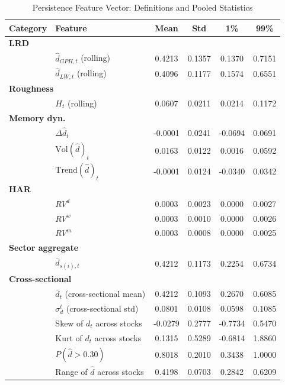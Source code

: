 
\begin{table}[htbp]
\centering
\caption{Persistence Feature Vector: Definitions and Pooled Statistics}
\label{tab:features}
\small
\begin{tabular}{llcccc}
\toprule
Category & Feature & Mean & Std & 1\% & 99\% \\
\midrule
\multicolumn{6}{l}{\textbf{LRD}} \\
  & $\hat d_{GPH,t}$ (rolling) & 0.4213 & 0.1357 & 0.1370 & 0.7151 \\
  & $\hat d_{LW,t}$ (rolling) & 0.4096 & 0.1177 & 0.1574 & 0.6551 \\
\midrule
\multicolumn{6}{l}{\textbf{Roughness}} \\
  & $H_t$ (rolling) & 0.0607 & 0.0211 & 0.0214 & 0.1172 \\
\midrule
\multicolumn{6}{l}{\textbf{Memory dyn.}} \\
  & $\Delta\hat d_t$ & -0.0001 & 0.0241 & -0.0694 & 0.0691 \\
  & $\mathrm{Vol}(\hat d)_t$ & 0.0163 & 0.0122 & 0.0016 & 0.0592 \\
  & $\mathrm{Trend}(\hat d)_t$ & -0.0001 & 0.0124 & -0.0340 & 0.0342 \\
\midrule
\multicolumn{6}{l}{\textbf{HAR}} \\
  & $RV^d$ & 0.0003 & 0.0023 & 0.0000 & 0.0027 \\
  & $RV^w$ & 0.0003 & 0.0010 & 0.0000 & 0.0026 \\
  & $RV^m$ & 0.0003 & 0.0008 & 0.0000 & 0.0025 \\
\midrule
\multicolumn{6}{l}{\textbf{Sector aggregate}} \\
  & $\bar d_{s(i),t}$ & 0.4212 & 0.1173 & 0.2254 & 0.6734 \\
\midrule
\multicolumn{6}{l}{\textbf{Cross-sectional}} \\
  & $\bar d_t$ (cross-sectional mean) & 0.4212 & 0.1093 & 0.2670 & 0.6085 \\
  & $\sigma_d^t$ (cross-sectional std) & 0.0801 & 0.0108 & 0.0598 & 0.1085 \\
  & Skew of $d_t$ across stocks & -0.0279 & 0.2777 & -0.7734 & 0.5470 \\
  & Kurt of $d_t$ across stocks & 0.1315 & 0.5289 & -0.6814 & 1.8860 \\
  & $P(\hat d > 0.30)$ & 0.8018 & 0.2010 & 0.3438 & 1.0000 \\
  & Range of $\hat d$ across stocks & 0.4198 & 0.0703 & 0.2842 & 0.6209 \\

\end{tabular}
\end{table}
